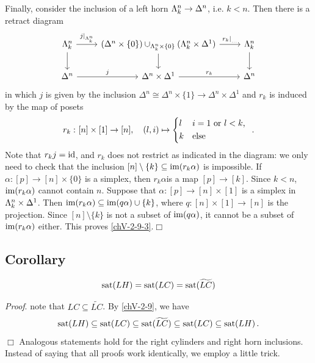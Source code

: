         Finally, consider the inclusion of a left horn $\Lambda^{n}_{k} \to \Delta^n$, i.e. $k < n$. Then there is a retract diagram
        \begin{equation*}
            \begin{tikzcd}
                \horn{n}{k} \arrow[r, "{j|}_{\horn{n}{k}}"] \arrow[d] & (\Delta^n \times \{0\}) \cup_{\horn{n}{k} \times \{0\}} (\horn{n}{k} \times \Delta^1) \arrow[r, "{r_k|}_{\ldots}"] \arrow[d] & \horn{n}{k} \arrow[d] \\
                \Delta^n \arrow[r, "j"] & \Delta^n \times \Delta^1 \arrow[r, "r_k"] & \Delta^n
            \end{tikzcd}
        \end{equation*}
        in which $j$ is given by the inclusion $\Delta^n \cong \Delta^n \times \{1\} \to \Delta^n \times \Delta^1$ and $r_k$ is induced by the map of posets
        \begin{equation*}
            r_k \,\colon [n] \times [1] \to [n], \quad (l, i) \mapsto
            \begin{cases*}
                l &$i = 1$ or $l < k$, \\
                k & else
            \end{cases*} \,.
        \end{equation*}
        Note that $r_k j = \operatorname{id}$, and $r_k$ does not restrict as indicated in the diagram: we only need to check that the inclusion $[n] \setminus \{k\} \subseteq \operatorname{im}(r_k \alpha)$ is impossible. If $\alpha \colon [p] \to [n] \times \{0\}$ is a simplex, then $r_k \alpha$is a map $[p] \to [k]$. Since $k < n$, $\operatorname{im}(r_k \alpha)$ cannot contain $n$. Suppose that $\alpha \colon [p] \to [n] \times [1]$ is a simplex in $\Lambda^{n}_{k} \times \Delta^1$. Then $\operatorname{im}(r_k \alpha) \subseteq \operatorname{im}(q \alpha) \cup \{k\}$, where $q \colon [n] \times [1] \to [n]$ is the projection. Since $[n] \setminus \{k\}$ is not a subset of $\operatorname{im}(q \alpha)$, it cannot be a subset of $\operatorname{im}(r_k \alpha)$ either. This proves \ref{chV-2-9-3}.\hfill$\Box$ 

    \subsection{Corollary}\label{chV-2-10}
        \begin{equation*}
            \operatorname{sat}(LH) = \operatorname{sat}(LC) = \operatorname{sat}(\widetilde{LC})
        \end{equation*}

        \emph{Proof}. note that $LC \subseteq \widetilde{LC}$. By \ref{chV-2-9}, we have
        \begin{equation*}
            \operatorname{sat}(LH) \subseteq \operatorname{sat}(LC) \subseteq \operatorname{sat}(\widetilde{LC}) \subseteq \operatorname{sat}(LC) \subseteq \operatorname{sat}(LH) \,.
        \end{equation*}\hfill$\Box$
        Analogous statements hold for the right cylinders and right horn inclusions. Instead of saying that all proofs work identically, we employ a little trick.

